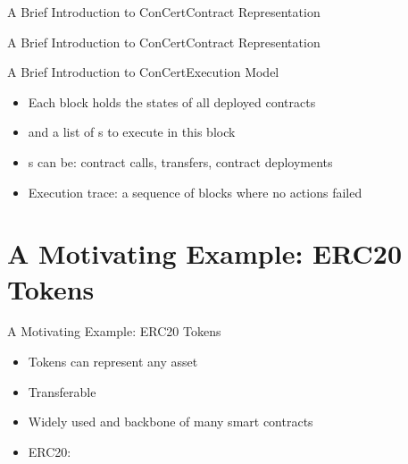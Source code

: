 


\begin{frame}{A Brief Introduction to ConCert}{Contract Representation}
\initfun
\end{frame}

\begin{frame}{A Brief Introduction to ConCert}{Contract Representation}
\receivefun
\end{frame}

\begin{frame}{A Brief Introduction to ConCert}{Execution Model}
\begin{itemize}
    \item Each block holds the states of all deployed contracts
    \item and a list of s to execute in this block
    \item {}s can be: contract calls, transfers, contract deployments
    \item Execution trace: a sequence of blocks where no actions failed 
\end{itemize}
\end{frame}

\section{A Motivating Example: ERC20 Tokens}

\begin{frame}{A Motivating Example: ERC20 Tokens}
\begin{itemize}
    \item Tokens can represent any asset
    \item Transferable
    \item Widely used and backbone of many smart contracts
    \item ERC20: 
\end{itemize}
\end{frame}


